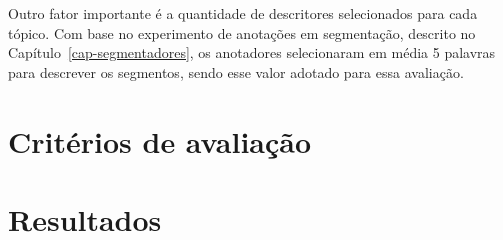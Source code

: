 Outro fator importante é a quantidade de descritores selecionados para cada tópico. Com base no experimento de anotações em segmentação, descrito no Capítulo~\ref{cap-segmentadores}, os anotadores selecionaram em média 5 palavras para descrever os segmentos, sendo esse valor adotado para essa avaliação.






\section{Critérios de avaliação}


\section{Resultados}


